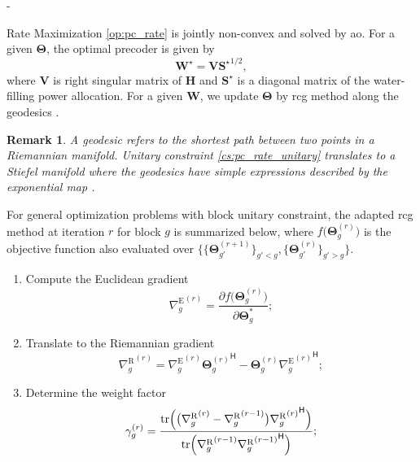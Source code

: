 \documentclass[journal]{IEEEtran}
\newtheorem{remark}{Remark}
\begin{document}
\begin{section}{-}
\begin{subsection}{Rate Maximization}
		\eqref{op:pc_rate} is jointly non-convex and solved by \gls{ao}.
		For a given $\mathbf{\Theta}$, the optimal precoder is given by
		\begin{equation}
			\mathbf{W}^\star = \mathbf{V} {\mathbf{S}^\star}^{1/2},
		\end{equation}
		where $\mathbf{V}$ is right singular matrix of $\mathbf{H}$ and $\mathbf{S}^\star$ is a diagonal matrix of the water-filling power allocation.
		For a given $\mathbf{W}$, we update $\mathbf{\Theta}$ by \gls{rcg} method along the geodesics \cite{Abrudan2009}.
		\begin{remark}
			A geodesic refers to the shortest path between two points in a Riemannian manifold.
			Unitary constraint \eqref{cs:pc_rate_unitary} translates to a Stiefel manifold where the geodesics have simple expressions described by the exponential map \cite{Abrudan2008}.
		\end{remark}
		For general optimization problems with block unitary constraint, the adapted \gls{rcg} method at iteration $r$ for block $g$ is summarized below, where $f\bigl(\mathbf{\Theta}_g^{(r)}\bigr)$ is the objective function also evaluated over $\bigl\{ \{\mathbf{\Theta}_{g'}^{(r+1)}\}_{g'<g}, \{\mathbf{\Theta}_{g'}^{(r)}\}_{g'>g} \bigr\}$.
		\begin{enumerate}
			\item Compute the Euclidean gradient
			\begin{equation}
				{\nabla_g^\mathrm{E}}^{(r)} = \frac{\partial f\bigl(\mathbf{\Theta}_g^{(r)}\bigr)}{\partial \mathbf{\Theta}_g^*};
				\label{eq:rcg_gradient_euclidean}
			\end{equation}
			\item Translate to the Riemannian gradient
			\begin{equation}
				{\nabla_g^\mathrm{R}}^{(r)} = {\nabla_g^\mathrm{E}}^{(r)} {\mathbf{\Theta}_g^{(r)}}^\mathsf{H} - \mathbf{\Theta}_g^{(r)} {{\nabla_g^\mathrm{E}}^{(r)}}^\mathsf{H};
				\label{eq:rcg_gradient_riemannian}
			\end{equation}
			\item Determine the weight factor
			\begin{equation}
				\gamma_g^{(r)} = \frac{\mathrm{tr}\Bigl(\bigl({\nabla_g^\mathrm{R}}^{(r)} - {\nabla_g^\mathrm{R}}^{(r-1)}\bigr) {{\nabla_g^\mathrm{R}}^{(r)}}^\mathsf{H}\Bigr)}{\mathrm{tr}\Bigl({\nabla_g^\mathrm{R}}^{(r-1)} {{\nabla_g^\mathrm{R}}^{(r-1)}}^\mathsf{H}\Bigr)};

\end{equation}
\end{enumerate}
\end{subsection}
\end{section}
\end{document}
